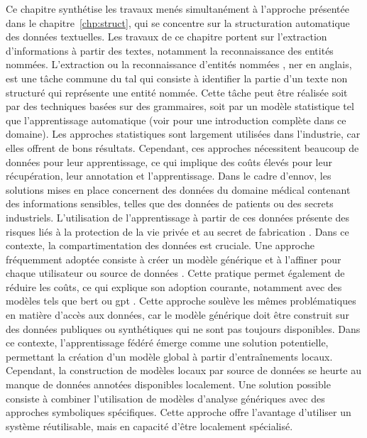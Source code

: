 Ce chapitre synthétise les travaux menés simultanément à l'approche présentée dans le chapitre~\ref{chp:struct}, qui se concentre sur la structuration automatique des données textuelles.
Les travaux de ce chapitre portent sur l'extraction d'informations à partir des textes, notamment la reconnaissance des entités nommées.
L'extraction ou la reconnaissance d'entités nommées \cite{patel-schneiderUsingDescriptionLogics2015}, \gls{ner} en anglais, est une tâche commune du \gls{tal} qui consiste à identifier la partie d'un texte non structuré qui représente une entité nommée.
Cette tâche peut être réalisée soit par des techniques basées sur des grammaires, soit par un modèle statistique tel que l'apprentissage automatique (voir \cite{jurafskySpeechLanguageProcessing2008} pour une introduction complète dans ce domaine).
Les approches statistiques sont largement utilisées dans l'industrie, car elles offrent de bons résultats.
Cependant, ces approches nécessitent beaucoup de données pour leur apprentissage, ce qui implique des coûts élevés pour leur récupération, leur annotation et l'apprentissage.
Dans le cadre d'\gls{ennov}, les solutions mises en place concernent des données du domaine médical contenant des informations sensibles, telles que des données de patients ou des secrets industriels.
L'utilisation de l'apprentissage à partir de ces données présente des risques liés à la protection de la vie privée et au secret de fabrication \cite{fredriksonModelInversionAttacks2015,songPrivacyRisksSecuring2019}.
Dans ce contexte, la compartimentation des données est cruciale.
Une approche fréquemment adoptée consiste à créer un modèle générique et à l'affiner pour chaque utilisateur ou source de données \cite{ribeiroWhyShouldTrust2016}.
Cette pratique permet également de réduire les coûts, ce qui explique son adoption courante, notamment avec des modèles tels que \gls{bert} \cite{devlinBERTPretrainingDeep2019} ou \gls{gpt} \cite{radfordImprovingLanguageUnderstanding2018, brownLanguageModelsAre2020}.
Cette approche soulève les mêmes problématiques en matière d'accès aux données, car le modèle générique doit être construit sur des données publiques ou synthétiques qui ne sont pas toujours disponibles.
Dans ce contexte, l'apprentissage fédéré émerge comme une solution potentielle, permettant la création d'un modèle global à partir d'entraînements locaux.
Cependant, la construction de modèles locaux par source de données se heurte au manque de données annotées disponibles localement.
Une solution possible consiste à combiner l'utilisation de modèles d'analyse génériques avec des approches symboliques spécifiques.
Cette approche offre l'avantage d'utiliser un système réutilisable, mais en capacité d'être localement spécialisé.

